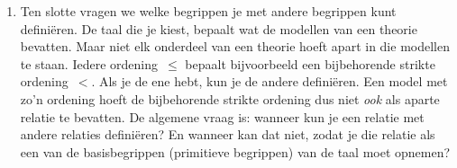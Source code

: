 \documentclass[openany]{memoir}
\begin{document}
\begin{explain}
\begin{enumerate}
  axioma's van de meetkunde.
\item Ten slotte vragen we welke begrippen je met andere begrippen kunt
  definiëren. De taal die je kiest, bepaalt wat de modellen van een
  theorie bevatten. Maar niet elk onderdeel van een theorie hoeft
  apart in die modellen te staan. Iedere ordening~$\le$ bepaalt
  bijvoorbeeld een bijbehorende strikte ordening~$<$. Als je de ene
  hebt, kun je de andere definiëren. Een model met zo'n ordening hoeft
  de bijbehorende strikte ordening dus niet \emph{ook} als aparte
  relatie te bevatten. De algemene vraag is: wanneer kun je een
  relatie met andere relaties definiëren? En wanneer kan dat niet,
  zodat je die relatie als een van de basisbegrippen (primitieve
  begrippen) van de taal moet opnemen?
\end{enumerate}
\end{explain}
\endgroup

\begingroup
\def\olfilename{OLP-0169}
\def\olfilepath{content/first-order-logic/models-theories/}
\hypertarget{unit-OLP-0169}{}




\end{document}
